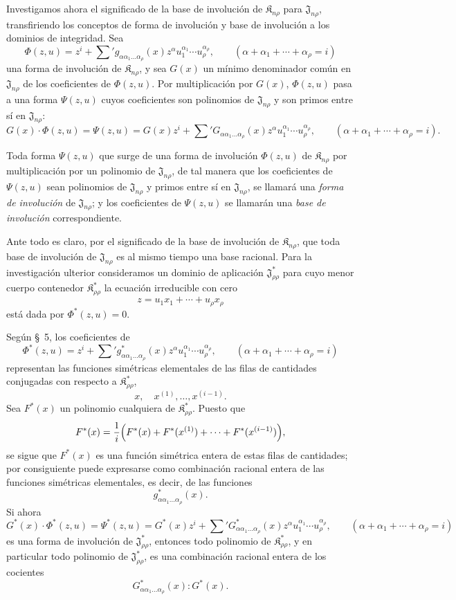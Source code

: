 \documentclass[11pt]{article}
\providecommand{\Kfield}{\mathfrak{K}}
\providecommand{\Jdom}{\mathfrak{J}}
\begin{document}
Investigamos ahora el significado de la base de involución de $\Kfield_{n\rho}$ para $\Jdom_{n\rho}$, transfiriendo los conceptos de forma de involución y base de involución a los dominios de integridad. Sea
\[
  \Phi(z,u)=z^i+\sum{}' g_{\alpha\alpha_1\ldots\alpha_\rho}(x)
  z^\alpha u_1^{\alpha_1}\cdots u_\rho^{\alpha_\rho},
  \qquad
  (\alpha+\alpha_1+\cdots+\alpha_\rho=i)
\]
una forma de involución de $\Kfield_{n\rho}$, y sea $G(x)$ un mínimo denominador común en $\Jdom_{n\rho}$ de los coeficientes de $\Phi(z,u)$. Por multiplicación por $G(x)$, $\Phi(z,u)$ pasa a una forma $\Psi(z,u)$ cuyos coeficientes son polinomios de $\Jdom_{n\rho}$ y son primos entre sí en $\Jdom_{n\rho}$:
\[
  G(x)\cdot\Phi(z,u)=\Psi(z,u)
  =G(x)z^i+
  \sum{}' G_{\alpha\alpha_1\ldots\alpha_\rho}(x)
  z^\alpha u_1^{\alpha_1}\cdots u_\rho^{\alpha_\rho},
  \qquad
  (\alpha+\alpha_1+\cdots+\alpha_\rho=i).
\]

Toda forma $\Psi(z,u)$ que surge de una forma de involución $\Phi(z,u)$ de $\Kfield_{n\rho}$ por multiplicación por un polinomio de $\Jdom_{n\rho}$, de tal manera que los coeficientes de $\Psi(z,u)$ sean polinomios de $\Jdom_{n\rho}$ y primos entre sí en $\Jdom_{n\rho}$, se llamará una \emph{forma de involución} de $\Jdom_{n\rho}$; y los coeficientes de $\Psi(z,u)$ se llamarán una \emph{base de involución} correspondiente.

Ante todo es claro, por el significado de la base de involución de $\Kfield_{n\rho}$, que toda base de involución de $\Jdom_{n\rho}$ es al mismo tiempo una base racional. Para la investigación ulterior consideramos un dominio de aplicación $\Jdom^*_{\rho\rho}$ para cuyo menor cuerpo contenedor $\Kfield^*_{\rho\rho}$ la ecuación irreducible con cero
\[
  z=u_1x_1+\cdots+u_\rho x_\rho
\]
está dada por $\Phi^*(z,u)=0$.

Según \S\ 5, los coeficientes de
\[
  \Phi^*(z,u)=z^i+\sum{}' g^*_{\alpha\alpha_1\ldots\alpha_\rho}(x)
  z^\alpha u_1^{\alpha_1}\cdots u_\rho^{\alpha_\rho},
  \qquad
  (\alpha+\alpha_1+\cdots+\alpha_\rho=i)
\]
representan las funciones simétricas elementales de las filas de cantidades conjugadas con respecto a $\Kfield^*_{\rho\rho}$,
\[
  x,\quad x^{(1)},\ldots,x^{(i-1)}.
\]
Sea $F^*(x)$ un polinomio cualquiera de $\Kfield^*_{\rho\rho}$. Puesto que
\[
  F^*(x)=\frac1i\Bigl(F^*(x)+F^*(x^{(1)})+
  \cdots+F^*(x^{(i-1)})\Bigr),
\]
se sigue que $F^*(x)$ es una función simétrica entera de estas filas de cantidades; por consiguiente puede expresarse como combinación racional entera de las funciones simétricas elementales, es decir, de las funciones
\[
  g^*_{\alpha\alpha_1\ldots\alpha_\rho}(x).
\]
Si ahora
\[
  G^*(x)\cdot\Phi^*(z,u)=\Psi^*(z,u)
  =G^*(x)z^i+
  \sum{}'G^*_{\alpha\alpha_1\ldots\alpha_\rho}(x)
  z^\alpha u_1^{\alpha_1}\cdots u_\rho^{\alpha_\rho},
  \qquad
  (\alpha+\alpha_1+\cdots+\alpha_\rho=i)
\]
es una forma de involución de $\Jdom^*_{\rho\rho}$, entonces todo polinomio de $\Kfield^*_{\rho\rho}$, y en particular todo polinomio de $\Jdom^*_{\rho\rho}$, es una combinación racional entera de los cocientes
\[
  G^*_{\alpha\alpha_1\ldots\alpha_\rho}(x):G^*(x).
\]
\end{document}
